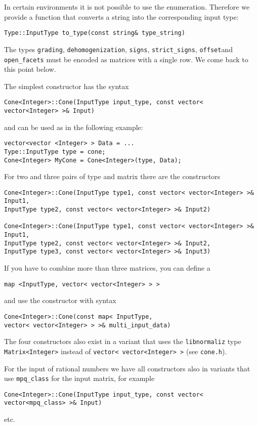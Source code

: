 \begin{small}
In certain environments it is not possible to use the enumeration. Therefore we provide a function that converts a string into the corresponding input type:
\begin{Verbatim}
Type::InputType to_type(const string& type_string)
\end{Verbatim}

The types \verb|grading|, \verb|dehomogenization|, \verb|signs|, \verb|strict_signs|, \verb|offset|and \verb|open_facets| must be encoded as matrices with a single row. We come back to this point below.

The simplest constructor has the syntax
\begin{Verbatim}
Cone<Integer>::Cone(InputType input_type, const vector< vector<Integer> >& Input)
\end{Verbatim}
and can be used as in the following example:
\begin{Verbatim}
vector<vector <Integer> > Data = ...
Type::InputType type = cone;
Cone<Integer> MyCone = Cone<Integer>(type, Data);
\end{Verbatim}
For two and three pairs of type and matrix there are the constructors
\begin{Verbatim}
Cone<Integer>::Cone(InputType type1, const vector< vector<Integer> >& Input1,
InputType type2, const vector< vector<Integer> >& Input2)

Cone<Integer>::Cone(InputType type1, const vector< vector<Integer> >& Input1,
InputType type2, const vector< vector<Integer> >& Input2,
InputType type3, const vector< vector<Integer> >& Input3)
\end{Verbatim}

If you have to combine more than three matrices, you can define a
\begin{Verbatim}
map <InputType, vector< vector<Integer> > >
\end{Verbatim}
and use the constructor with syntax
\begin{Verbatim}
Cone<Integer>::Cone(const map< InputType, 
vector< vector<Integer> > >& multi_input_data)
\end{Verbatim}

The four constructors also exist in a variant that uses the \verb|libnormaliz| type \verb|Matrix<Integer>| instead of \verb|vector< vector<Integer> >| (see \verb|cone.h|).

For the input of rational numbers we have all constructors also in variants that use \verb|mpq_class| for the input matrix, for example
\begin{Verbatim}
Cone<Integer>::Cone(InputType input_type, const vector< vector<mpq_class> >& Input)
\end{Verbatim}
etc.


\end{small}

